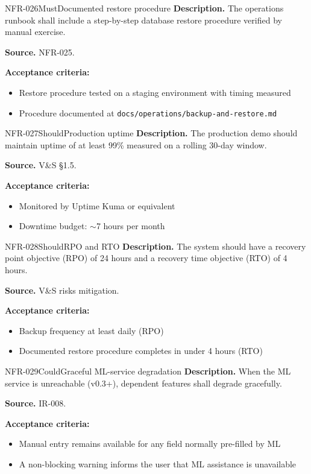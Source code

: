 \documentclass[11pt,a4paper]{article}
\begin{document}
\begin{requirement}{NFR-026}{Must}{Documented restore procedure}
\textbf{Description.} The operations runbook shall include a step-by-step database restore procedure verified by manual exercise.

\textbf{Source.} NFR-025.

\textbf{Acceptance criteria:}
\begin{itemize}
    \item Restore procedure tested on a staging environment with timing measured
    \item Procedure documented at \texttt{docs/operations/backup-and-restore.md}
\end{itemize}
\end{requirement}

\begin{requirement}{NFR-027}{Should}{Production uptime}
\textbf{Description.} The production demo should maintain uptime of at least 99\% measured on a rolling 30-day window.

\textbf{Source.} V\&S \S1.5.

\textbf{Acceptance criteria:}
\begin{itemize}
    \item Monitored by Uptime Kuma or equivalent
    \item Downtime budget: $\sim$7 hours per month
\end{itemize}
\end{requirement}

\begin{requirement}{NFR-028}{Should}{RPO and RTO}
\textbf{Description.} The system should have a recovery point objective (RPO) of 24 hours and a recovery time objective (RTO) of 4 hours.

\textbf{Source.} V\&S risks mitigation.

\textbf{Acceptance criteria:}
\begin{itemize}
    \item Backup frequency at least daily (RPO)
    \item Documented restore procedure completes in under 4 hours (RTO)
\end{itemize}
\end{requirement}

\begin{requirement}{NFR-029}{Could}{Graceful ML-service degradation}
\textbf{Description.} When the ML service is unreachable (v0.3+), dependent features shall degrade gracefully.

\textbf{Source.} IR-008.

\textbf{Acceptance criteria:}
\begin{itemize}
    \item Manual entry remains available for any field normally pre-filled by ML
    \item A non-blocking warning informs the user that ML assistance is unavailable
\end{itemize}
\end{requirement}
\end{document}
